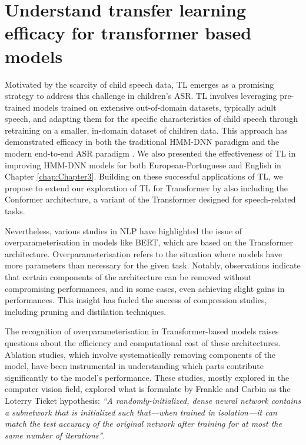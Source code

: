 \section{Understand transfer learning efficacy for transformer based models}
Motivated by the scarcity of child speech data, TL emerges as a promising strategy to address this challenge in children's ASR. TL involves leveraging pre-trained models trained on extensive out-of-domain datasets, typically adult speech, and adapting them for the specific characteristics of child speech through retraining on a smaller, in-domain dataset of children data. This approach has demonstrated efficacy in both the traditional HMM-DNN paradigm \cite{shivakumar2020transfer} and the modern end-to-end ASR paradigm \cite{sri_end2end,gelin2021endtoend}. We also presented the effectiveness of TL in improving HMM-DNN models for both European-Portuguese and English in Chapter \ref{chap:Chapter3}. Building on these successful applications of TL, we propose to extend our exploration of TL for Transformer by also including the Conformer architecture, a variant of the Transformer designed for speech-related tasks.

Nevertheless, various studies in NLP have highlighted the issue of overparameterisation in models like BERT, which are based on the Transformer architecture. Overparameterisation refers to the situation where models have more parameters than necessary for the given task. Notably, observations indicate that certain components of the architecture can be removed without compromising performances, and in some cases, even achieving slight gains in performances. This insight has fueled the success of compression studies, including pruning and distilation techniques.

The recognition of overparameterisation in Transformer-based models raises questions about the efficiency and computational cost of these architectures. Ablation studies, which involve systematically removing components of the model, have been instrumental in understanding which parts contribute significantly to the model's performance. These studies, mostly explored in the computer vision field, explored what is formulate by Frankle and Carbin \cite{frankle2018lottery} as the Loterry Ticket hypothesis: \textit{``A randomly-initialized, dense neural network contains a subnetwork that is initialized such that—when trained in isolation—it can match the test accuracy of the original network after training for at most the same number of iterations''}.

